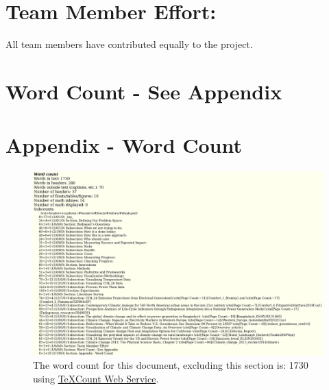 \documentclass[sigconf,nonacm=true]{acmart}
\begin{document}
\section{Team Member Effort:}
All team members have contributed equally to the project.

\section{Word Count - See Appendix}




% 
\onecolumn
\newpage
\section*{Appendix - Word Count}

\begin{figure}[H]
	\includegraphics[width=0.9\linewidth]{images/wordCount}
	\caption{The word count for this document, excluding this section is: 1730 using \href{https://app.uio.no/ifi/texcount/online.php}{\color{blue}TeXCount Web Service}.}\label{fig:wordCount}
\end{figure}
\end{document}
